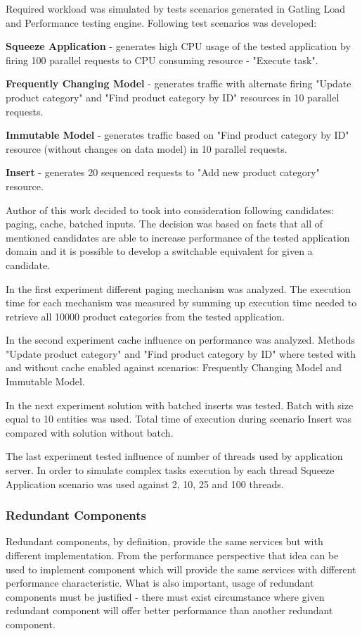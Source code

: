 \documentclass[10pt,a4paper]{article}
\let\tempone\itemize
\let\temptwo\enditemize
\renewenvironment{itemize}{\tempone\addtolength{\itemsep}{-0.4\baselineskip}}{\temptwo}
\begin{document}
Required workload was simulated by tests scenarios generated in Gatling Load and Performance testing engine\cite{gatling}. Following test scenarios was developed:
\begin{itemize}
\item \textbf{Squeeze Application} - generates high CPU usage of the tested application by firing 100 parallel requests to CPU consuming resource - "Execute task". 
\item \textbf{Frequently Changing Model} - generates traffic with alternate firing  "Update product category" and "Find product category by ID" resources in 10 parallel requests.
\item \textbf{Immutable Model} - generates traffic based on "Find product category by ID" resource (without changes on data model) in 10 parallel requests.
\item \textbf{Insert} - generates 20 sequenced requests to "Add new product category" resource. 
\end{itemize}

Author of this work decided to took into consideration following candidates: paging, cache, batched inputs. The decision was based on facts that all of mentioned candidates are able to increase performance of the  tested application domain and it is possible to develop a switchable equivalent for given a candidate. 

In the first experiment different paging mechanism was analyzed. The execution time for each mechanism was measured by summing up execution time needed to retrieve all 10000 product categories from the tested application.   

In the second experiment cache influence on performance was analyzed. Methods "Update product category" and "Find product category by ID" where tested with and without cache enabled against scenarios: Frequently Changing Model and    Immutable Model. 

In the next experiment solution with batched inserts was tested. Batch with size equal to 10 entities was used. Total time of execution during scenario Insert was compared with solution without batch. 

The last experiment tested influence of number of threads used by application server. In order to simulate complex tasks execution by each thread Squeeze Application scenario was used against 2, 10, 25 and 100 threads. 

\subsubsection{Redundant Components}
Redundant components, by definition, provide the same services but with different implementation. From the performance perspective that idea can be used to implement component which will provide the same services with different performance characteristic. What is also important, usage of redundant components must be justified - there must exist circumstance where given redundant component will offer better performance than another redundant component. 
\end{document}
